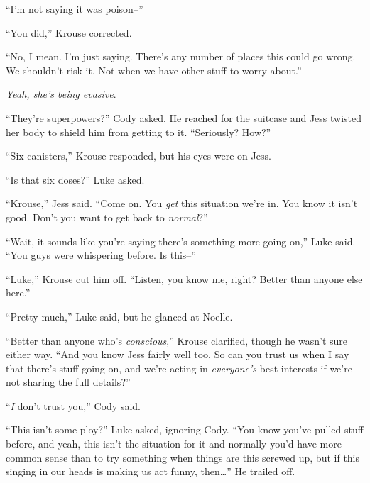 ``I'm not saying it was poison--''



``You did,'' Krouse corrected.



``No, I mean.  I'm just saying.  There's any number of places this could go wrong.  We shouldn't risk it.  Not when we have other stuff to worry about.''



\emph{Yeah, she's being evasive}.



``They're superpowers?'' Cody asked.  He reached for the suitcase and Jess twisted her body to shield him from getting to it.  ``Seriously?  How?''



``Six canisters,'' Krouse responded, but his eyes were on Jess.



``Is that six doses?'' Luke asked.



``Krouse,'' Jess said.  ``Come on.  You \emph{get} this situation we're in.  You know it isn't good.  Don't you want to get back to \emph{normal}?''



``Wait, it sounds like you're saying there's something more going on,'' Luke said.  ``You guys were whispering before.  Is this--''



``Luke,'' Krouse cut him off.  ``Listen, you know me, right?  Better than anyone else here.''



``Pretty much,'' Luke said, but he glanced at Noelle.



``Better than anyone who's \emph{conscious},'' Krouse clarified, though he wasn't sure either way.  ``And you know Jess fairly well too.  So can you trust us when I say that there's stuff going on, and we're acting in \emph{everyone's} best interests if we're not sharing the full details?''



``\emph{I} don't trust you,'' Cody said.



``This isn't some ploy?'' Luke asked, ignoring Cody.  ``You know you've pulled stuff before, and yeah, this isn't the situation for it and normally you'd have more common sense than to try something when things are this screwed up, but if this singing in our heads is making us act funny, then\ldots''  He trailed off.



